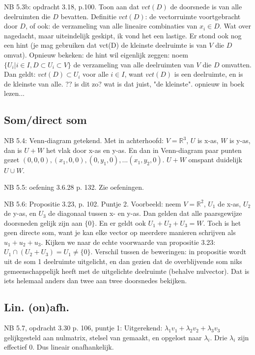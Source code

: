 \documentclass{article}
\begin{document}
NB 5.3b:  opdracht 3.18, p.100. Toon aan dat $vct(D)$ de doorsnede is van alle deelruimten die $D$ bevatten. 
Definitie $vct(D)$: de vectorruimte voortgebracht door $D$, of ook: de verzameling van alle lineaire combinaties van $x_i \in D$. Wat over nagedacht, maar uiteindelijk geskipt, ik vond het een lastige. Er stond ook nog een hint (je mag gebruiken dat vct(D) de kleinste deelruimte is van $V$ die $D$ omvat). 
Opnieuw bekeken: de hint wil eigenlijk zeggen: noem $\{ U_i | i \in I, D \subset  U_i \subset V \}$  de verzameling van alle deelruimten van $V$ die $D$ omvatten. Dan geldt: $vct(D) \subset U_i$ voor alle $i \in I$, want $vct(D)$ is een deelruimte, en is de kleinste van alle. ?? is dit zo? wat is dat juist, "de kleinste". opnieuw in boek lezen... 


\subsection{Som/direct som} 
NB 5.4:  Venn-diagram getekend. Met in achterhoofd: $V=\mathbb{R}^3$, $U$ is x-as, $W$ is y-as, dan is $U+W$ het vlak door x-as en y-as. En dan in Venn-diagram paar punten gezet $(0,0,0), (x_1,0,0), (0,y_1,0), ... (x_1,y_2,0)$. $U+W$ omspant duidelijk $U \cup W$. 

NB 5.5:  oefening 3.6.28 p. 132. Zie oefeningen. 

NB 5.6:  
Propositie 3.23, p. 102. Puntje 2. Voorbeeld: neem $V=\mathbb{R}^2$, $U_1$ de x-as, $U_2$ de y-as, en $U_3$ de diagonaal tussen x- en y-as. Dan gelden dat alle paarsgewijze doorsneden gelijk zijn aan $\{0\}$. En er geldt ook $U_1+U_2+U_3=W$. Toch is het geen directe som, want je kan elke vector op meerdere manieren schrijven als $u_1+u_2+u_3$. 
Kijken we naar de echte voorwaarde van propositie 3.23: $U_1 \cap ( U_2 + U_3 ) = U_1 \neq \{0\}$. Verschil tussen de beweringen: in propositie wordt uit de som 1 deelruimte uitgelicht, en dan gezien dat de overblijvende som niks gemeenschappelijk heeft met de uitgelichte deelruimte (behalve nulvector). Dat is iets helemaal anders dan twee aan twee doorsnedes bekijken. 


\subsection{Lin. (on)afh.}
NB 5.7, opdracht 3.30 p. 106, puntje 1: 
Uitgerekend: $\lambda_1 v_1 + \lambda_2 v_2 + \lambda_3 v_3$ gelijkgesteld aan nulmatrix, stelsel van gemaakt, en opgelost naar $\lambda_i$. Drie $\lambda_i$ zijn effectief 0. Dus lineair onafhankelijk. 
\end{document}
